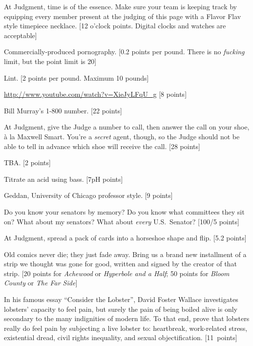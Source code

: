\documentclass{book}
\begin{document}
\begin{list}{}{}
\item At Judgment, time is of the essence. Make sure your team is keeping track by equipping every member present at the judging of this page with a Flavor Flav style timepiece necklace. [12 o'clock points. Digital clocks and watches are acceptable]

\item Commercially-produced pornography. [0.2 points per pound. There is no \emph{fucking} limit, but the point limit is 20]

\item Lint. [2 points per pound. Maximum 10 pounds]

\item \url{http://www.youtube.com/watch?v=XieJyLFqU_g} [8 points]

\item Bill Murray's 1-800 number. [22 points]

\item At Judgment, give the Judge a number to call, then answer the call on your shoe, \`{a} la Maxwell Smart. You're a \emph{secret} agent, though, so the Judge should not be able to tell in advance which shoe will receive the call. [28 points]

\item TBA. [2 points] 

\item Titrate an acid using bass. [7pH points]

\item Geddan, University of Chicago professor style. [9 points]

\item Do you know your senators by memory? Do you know what committees they sit on? What about my senators? What about \emph{every} U.S.\ Senator? [100/5 points]

\item At Judgment, spread a pack of cards into a horseshoe shape and flip. [5.2 points]

\item Old comics never die; they just fade away. Bring us a brand new installment of a strip we thought was gone for good, written and signed by the creator of that strip. [20 points for \emph{Achewood} or \emph{Hyperbole and a Half}; 50 points for \emph{Bloom County} or \emph{The Far Side}]

\item In his famous essay ``Consider the Lobster'', David Foster Wallace investigates lobsters' capacity to feel pain, but surely the pain of being boiled alive is only secondary to the many indignities of modern life. To that end, prove that lobsters really do feel pain by subjecting a live lobster to: heartbreak, work-related stress, existential dread, civil rights inequality, and sexual objectification. [11~points]


\end{list}
\end{document}
